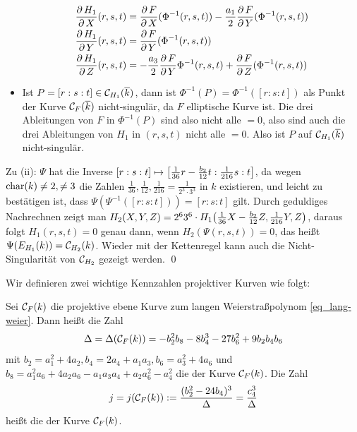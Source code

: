 \begin{bew}
\begin{itemize}
		\begin{equation}
		\begin{aligned}
			\frac{\der H_1}{\der X}(r,s,t) &= \frac{\der F}{\der X}(\Phi^{-1}(r,s,t)) - \frac{a_1}{2} \frac{\der F}{\der Y}(\Phi^{-1}(r,s,t)) \\
			\frac{\der H_1}{\der Y}(r,s,t) &= \frac{\der F}{\der Y} (\Phi^{-1}(r,s,t)) \\
			\frac{\der H_1}{\der Z}(r,s,t) &= -\frac{a_3}{2} \frac{\der F}{\der Y} \Phi^{-1}(r,s,t) + \frac{\der F}{\der Z}(\Phi^{-1}(r,s,t))
		\end{aligned}
		\end{equation}
		\item Ist $P = [r:s:t] \in \cc_{H_1}(\overline{k})$, dann ist $\Phi^{-1}(P) = \Phi^{-1}([r:s:t])$ als Punkt der Kurve $\cc_F(\overline{k})$ nicht-singulär, da $F$ elliptische Kurve ist. Die drei Ableitungen von $F$ in $\Phi^{-1}(P)$ sind also nicht alle $= 0$, also sind auch die drei Ableitungen von $H_1$ in $(r,s,t)$ nicht alle $=0$. Also ist $P$ auf $\cc_{H_1}(\overline{k})$ nicht-singulär.
	\end{itemize}
	Zu (ii): $\Psi$ hat die Inverse $[r:s:t] \mapsto \benbrace*{\frac{1}{36} r - \frac{b_2}{12}t : \frac{1}{216} s : t}$, da wegen $\Char(k) \neq 2, \neq 3$ die Zahlen $\frac{1}{36}, \frac{1}{12}, \frac{1}{216} = \frac{1}{2^3 \cdot 3^3}$ in $k$ existieren, und leicht zu bestätigen ist, dass $\Psi(\Psi^{-1}([r:s:t])) = [r:s:t]$ gilt. Durch geduldiges Nachrechnen zeigt man $H_2(X,Y,Z) = 2^6 3^6 \cdot H_1 \enbrace*{\frac{1}{36} X - \frac{b_2}{12}Z, \frac{1}{216} Y,Z}$, daraus folgt $H_1(r,s,t) = 0$ genau dann, wenn $H_2(\Psi(r,s,t))=0$, das heißt $\Psi(E_{H_1}(k)) = \cc_{H_2}(k)$. Wieder mit der Kettenregel kann auch die Nicht-Singularität von $\cc_{H_2}$ gezeigt werden. \qed
\end{bew}

Wir definieren zwei wichtige Kennzahlen projektiver Kurven wie folgt:
\begin{defn}
	Sei $\cc_F(k)$ die projektive ebene Kurve zum langen Weierstraßpolynom \eqref{eq_lang-weier}. Dann heißt die Zahl
	\[ \Delta = \Delta(\cc_F(k)) = -b_2^2 b_8 - 8b_4^3 - 27b_6^2 + 9b_2b_4b_6 \]
	mit $b_2 = a_1^2 + 4a_2, b_4 = 2a_4 + a_1 a_3, b_6 = a_3^2 + 4a_6$ und $b_8 = a_1^2 a_6 + 4a_2 a_6 - a_1a_3a_4 + a_2 a_6^2 - a_4^2$ die  der Kurve $\cc_F(k)$. Die Zahl 
	\[ j = j(\cc_F(k)) := \frac{(b_2^2 - 24b_4)^3}{\Delta} = \frac{c_4^3}{\Delta} \]
	heißt die  der Kurve $\cc_F(k)$. 
\end{defn}

